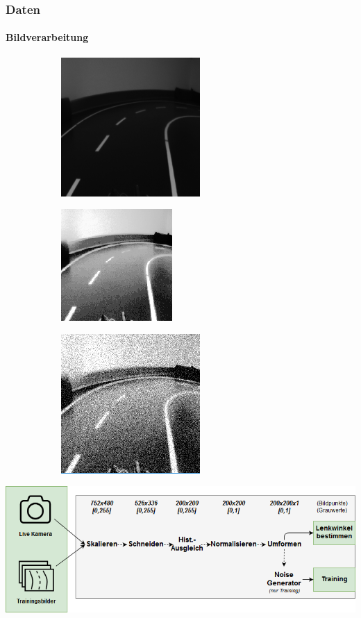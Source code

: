 \documentclass{beamer}
\begin{document}
\begin{frame}
\frametitle{Daten}
\framesubtitle{Bildverarbeitung}

\begin{minipage}{\textwidth}
\begin{figure}

	\begin{subfigure}{.25\textwidth}
		  \includegraphics[scale=0.32]{figures/200x200.png}
	\end{subfigure}%
	\begin{subfigure}{.25\textwidth}
		  \includegraphics[scale=0.4]{figures/200x200Hist.png}
	\end{subfigure}%
	\begin{subfigure}{.25\textwidth}
		  \includegraphics[scale=0.43]{figures/200x200Gauss.png}
	\end{subfigure}%
\end{figure}
\end{minipage}

\begin{minipage}{\textwidth}
\includegraphics[width=\linewidth]{figures/Pipeline.png}	
\end{minipage}


\end{frame}
\end{document}
